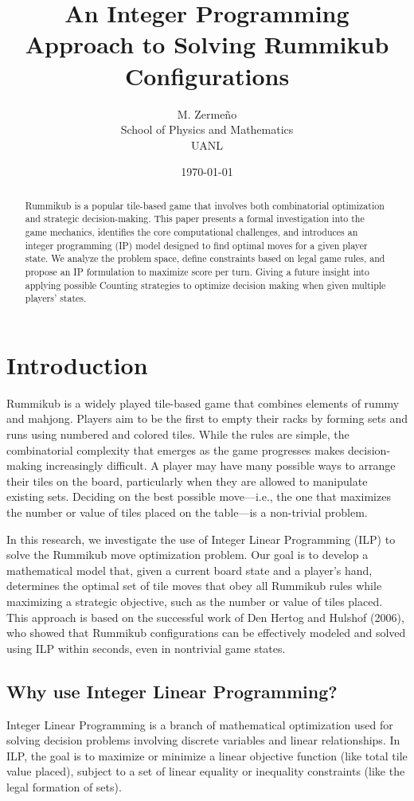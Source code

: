\documentclass[12pt]{article}
\title{An Integer Programming Approach to Solving Rummikub Configurations}
\author{M. Zermeño \\ School of Physics and Mathematics \\ UANL}
\date{\today}
\begin{document}
\sloppy
\maketitle

\begin{abstract}
\sloppy
Rummikub is a popular tile-based game that involves both combinatorial optimization 
and strategic decision-making. This paper presents a formal investigation into the game 
mechanics, identifies the core computational challenges, and introduces an integer 
programming (IP) model designed to find optimal moves for a given player state. 
We analyze the problem space, define constraints based on legal game rules, and 
propose an IP formulation to maximize score per turn. Giving a future insight into 
applying possible Counting strategies to optimize decision making when given 
multiple players' states.
\end{abstract}

\section{Introduction}
Rummikub is a widely played tile-based game that combines elements of rummy and mahjong. 
Players aim to be the first to empty their racks by forming sets and runs using numbered 
and colored tiles. While the rules are simple, the combinatorial complexity that emerges 
as the game progresses makes decision-making increasingly difficult. A player may have 
many possible ways to arrange their tiles on the board, particularly when they are allowed 
to manipulate existing sets. Deciding on the best possible move—i.e., the one that maximizes 
the number or value of tiles placed on the table—is a non-trivial problem.

In this research, we investigate the use of Integer Linear Programming (ILP) to solve the 
Rummikub move optimization problem. Our goal is to develop a mathematical model that, given 
a current board state and a player's hand, determines the optimal set of tile moves that 
obey all Rummikub rules while maximizing a strategic objective, such as the number or 
value of tiles placed. This approach is based on the successful work of Den Hertog and 
Hulshof (2006), who showed that Rummikub configurations can be effectively modeled and 
solved using ILP within seconds, even in nontrivial game states.

\subsection{Why use Integer Linear Programming?}
Integer Linear Programming is a branch of mathematical optimization used for solving decision
problems involving discrete variables and linear relationships. In ILP, the goal is to 
maximize or minimize a linear objective function (like total tile value placed), subject 
to a set of linear equality or inequality constraints (like the legal formation of sets).
\end{document}
